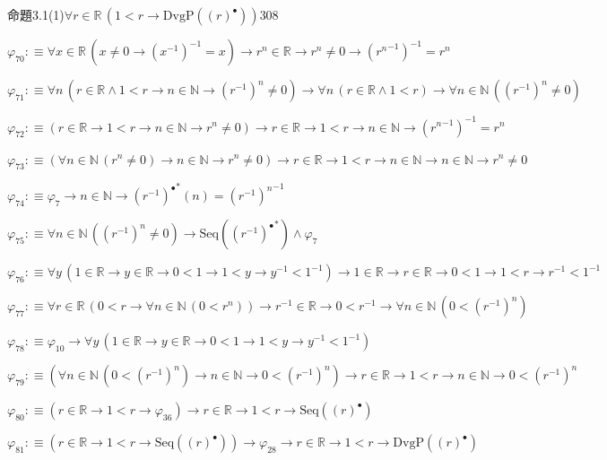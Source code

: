 \begin{fullproof}{命題3.1(1)}{$\forall r \in \mathbb{R}\,(1 < r \to \mathrm{DvgP}({(r)^{\bullet}}))$}{308}
\begin{abbrevlist}
\item $\varphi_{70} :\equiv \forall x \in \mathbb{R}\,(x \neq 0 \to (x^{-1})^{-1} = x) \to {{r}^{n}} \in \mathbb{R} \to {{r}^{n}} \neq 0 \to ({{r}^{n}}^{-1})^{-1} = {{r}^{n}}$
\item $\varphi_{71} :\equiv \forall n\,(r \in \mathbb{R} \land 1 < r \to n \in \mathbb{N} \to {{(r^{-1})}^{n}} \neq 0) \to \forall n\,(r \in \mathbb{R} \land 1 < r) \to \forall n \in \mathbb{N}\,({{(r^{-1})}^{n}} \neq 0)$
\item $\varphi_{72} :\equiv (r \in \mathbb{R} \to 1 < r \to n \in \mathbb{N} \to {{r}^{n}} \neq 0) \to r \in \mathbb{R} \to 1 < r \to n \in \mathbb{N} \to ({{r}^{n}}^{-1})^{-1} = {{r}^{n}}$
\item $\varphi_{73} :\equiv (\forall n \in \mathbb{N}\,({{r}^{n}} \neq 0) \to n \in \mathbb{N} \to {{r}^{n}} \neq 0) \to r \in \mathbb{R} \to 1 < r \to n \in \mathbb{N} \to n \in \mathbb{N} \to {{r}^{n}} \neq 0$
\item $\varphi_{74} :\equiv \varphi_{7} \to n \in \mathbb{N} \to {(r^{-1})^{\bullet}}^{\ast}(n) = {{(r^{-1})}^{n}}^{-1}$
\item $\varphi_{75} :\equiv \forall n \in \mathbb{N}\,({{(r^{-1})}^{n}} \neq 0) \to \mathrm{Seq}({(r^{-1})^{\bullet}}^{\ast}) \land \varphi_{7}$
\item $\varphi_{76} :\equiv \forall y\,(1 \in \mathbb{R} \to y \in \mathbb{R} \to 0 < 1 \to 1 < y \to y^{-1} < 1^{-1}) \to 1 \in \mathbb{R} \to r \in \mathbb{R} \to 0 < 1 \to 1 < r \to r^{-1} < 1^{-1}$
\item $\varphi_{77} :\equiv \forall r \in \mathbb{R}\,(0 < r \to \forall n \in \mathbb{N}\,(0 < {{r}^{n}})) \to r^{-1} \in \mathbb{R} \to 0 < r^{-1} \to \forall n \in \mathbb{N}\,(0 < {{(r^{-1})}^{n}})$
\item $\varphi_{78} :\equiv \varphi_{10} \to \forall y\,(1 \in \mathbb{R} \to y \in \mathbb{R} \to 0 < 1 \to 1 < y \to y^{-1} < 1^{-1})$
\item $\varphi_{79} :\equiv (\forall n \in \mathbb{N}\,(0 < {{(r^{-1})}^{n}}) \to n \in \mathbb{N} \to 0 < {{(r^{-1})}^{n}}) \to r \in \mathbb{R} \to 1 < r \to n \in \mathbb{N} \to 0 < {{(r^{-1})}^{n}}$
\item $\varphi_{80} :\equiv (r \in \mathbb{R} \to 1 < r \to \varphi_{36}) \to r \in \mathbb{R} \to 1 < r \to \mathrm{Seq}({(r)^{\bullet}})$
\item $\varphi_{81} :\equiv (r \in \mathbb{R} \to 1 < r \to \mathrm{Seq}({(r)^{\bullet}})) \to \varphi_{28} \to r \in \mathbb{R} \to 1 < r \to \mathrm{DvgP}({(r)^{\bullet}})$

\end{abbrevlist}
\end{fullproof}
